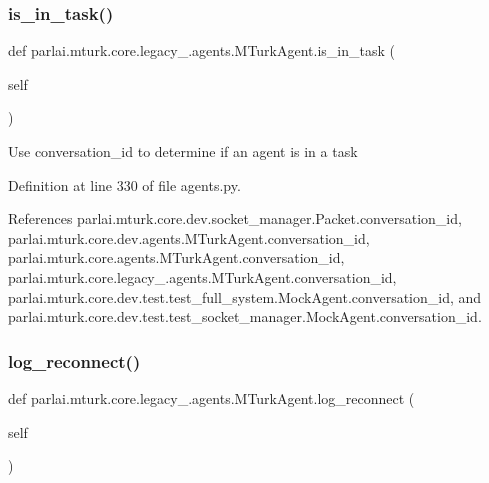 \subsubsection{\texorpdfstring{is\+\_\+in\+\_\+task()}{is\_in\_task()}}
{\footnotesize\ttfamily def parlai.\+mturk.\+core.\+legacy\+\_.\+agents.\+M\+Turk\+Agent.\+is\+\_\+in\+\_\+task (\begin{DoxyParamCaption}\item[{}]{self }\end{DoxyParamCaption})}

\begin{DoxyVerb}Use conversation_id to determine if an agent is in a task\end{DoxyVerb}
 

Definition at line 330 of file agents.\+py.



References parlai.\+mturk.\+core.\+dev.\+socket\+\_\+manager.\+Packet.\+conversation\+\_\+id, parlai.\+mturk.\+core.\+dev.\+agents.\+M\+Turk\+Agent.\+conversation\+\_\+id, parlai.\+mturk.\+core.\+agents.\+M\+Turk\+Agent.\+conversation\+\_\+id, parlai.\+mturk.\+core.\+legacy\+\_.\+agents.\+M\+Turk\+Agent.\+conversation\+\_\+id, parlai.\+mturk.\+core.\+dev.\+test.\+test\+\_\+full\+\_\+system.\+Mock\+Agent.\+conversation\+\_\+id, and parlai.\+mturk.\+core.\+dev.\+test.\+test\+\_\+socket\+\_\+manager.\+Mock\+Agent.\+conversation\+\_\+id.

\mbox{\label{classparlai_1_1mturk_1_1core_1_1legacy__2018_1_1agents_1_1MTurkAgent_affe73b112be62cb32e0f8122c5f030fd}} 
\subsubsection{\texorpdfstring{log\+\_\+reconnect()}{log\_reconnect()}}
{\footnotesize\ttfamily def parlai.\+mturk.\+core.\+legacy\+\_.\+agents.\+M\+Turk\+Agent.\+log\+\_\+reconnect (\begin{DoxyParamCaption}\item[{}]{self }\end{DoxyParamCaption})}

